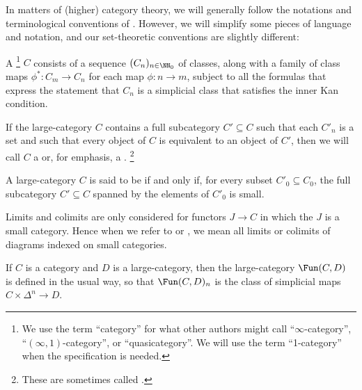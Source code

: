 In matters of (higher) category theory,
we will generally follow the notations and terminological conventions
of \cite{Lurie2009}.
However, we will simplify some pieces of language and notation,
and our set-theoretic conventions are slightly different:
\begin{definition}
	A %
	\footnote{We use the term \enquote{category}
		for what other authors might call
		\enquote{$ \infty $-category},
		\enquote{$(\infty,1)$-category}, or
		\enquote{quasicategory}.
		We will use the term \enquote{1-category}
	when the specification is needed.}
	$C$ consists of a sequence $(C_n)_{n\in\NN_0}$ of classes,
	along with a family of class maps $ \phi^{\ast} \colon C_m \to C_n $
	for each map $ \phi \colon n \to m $,
	subject to all the formulas that express the statement that $C_n$ is a simplicial class
	that satisfies the inner Kan condition.

	If the large-category $C$ contains a full subcategory $ C' \subseteq C $
	such that each $ C'_n $ is a set and
	such that every object of $ C $ is equivalent to an object of $ C' $,
	then we will call $ C $ a 
	or, for emphasis, a .%
	\footnote{These are sometimes called .}
	
	A large-category $ C $ is said to be  if and only if,
	for every subset $ C'_0 \subseteq C_0$,
	the full subcategory $ C' \subseteq C $ spanned by the elements of $ C'_0 $ is small.
	
	Limits and colimits are only considered for functors $ J \to C $ in which
	the $ J $ is a small category.
	Hence when we refer to  or ,
	we mean all limits or colimits of diagrams indexed on small categories.
	
	If $ C $ is a category and $ D $ is a large-category, 
	then the large-category $ \Fun(C, D) $ is defined in the usual way,
	so that $ \Fun(C, D)_n $ is the class of simplicial maps
	$ C \times \Delta^n \to D $.
\end{definition}

